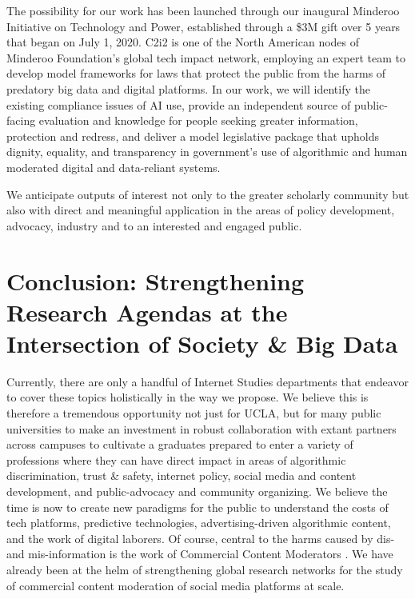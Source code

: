 \documentclass[11pt]{article}
\begin{document}
The possibility for our work has been launched through our inaugural Minderoo Initiative on Technology and Power, established through a \$3M gift over 5 years that began on July 1, 2020. C2i2 is one of the North American nodes of Minderoo Foundation's global tech impact network, employing an expert team to develop model frameworks for laws that protect the public from the harms of predatory big data and digital platforms. In our work, we will identify the existing compliance issues of AI use, provide an independent source of public-facing evaluation and knowledge for people seeking greater information, protection and redress, and deliver a model legislative package that upholds dignity, equality, and transparency in government's use of algorithmic and human moderated digital and data-reliant systems.

We anticipate outputs of interest not only to the greater scholarly community but also with direct and meaningful application in the areas of policy development, advocacy, industry and to an interested and engaged public. 


\section{Conclusion: Strengthening Research Agendas at the Intersection of Society \& Big Data}
Currently, there are only a handful of Internet Studies departments that endeavor to cover these topics holistically in the way we propose. We believe this is therefore a tremendous opportunity not just for UCLA, but for many public universities to make an investment in robust collaboration with extant partners across campuses to cultivate a graduates prepared to enter a variety of professions where they can have direct impact in areas of algorithmic discrimination, trust \& safety, internet policy, social media and content development, and public-advocacy and community organizing. We believe the time is now to create new paradigms for the public to understand the costs of tech platforms, predictive technologies, advertising-driven algorithmic content, and the work of digital laborers. Of course, central to the harms caused by dis- and mis-information is the work of Commercial Content Moderators \cite{roberts2019behind}. We have already been at the helm of strengthening global research networks for the study of commercial content moderation of social media platforms at scale. 
\end{document}
